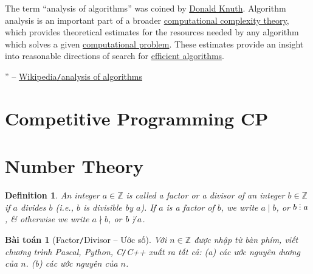 \documentclass{article}
\newtheorem{baitoan}{Bài toán}
\newtheorem{definition}{Definition}
\DeclareRobustCommand{\divby}{%
	\mathrel{\vbox{\baselineskip.65ex\lineskiplimit0pt\hbox{.}\hbox{.}\hbox{.}}}%
}
\begin{document}
The term ``analysis of algorithms'' was coined by \href{https://en.wikipedia.org/wiki/Donald_Knuth}{Donald Knuth}. Algorithm analysis is an important part of a broader \href{https://en.wikipedia.org/wiki/Computational_complexity_theory}{computational complexity theory}, which provides theoretical estimates for the resources needed by any algorithm which solves a given \href{https://en.wikipedia.org/wiki/Computational_problem}{computational problem}. These estimates provide an insight into reasonable directions of search for \href{https://en.wikipedia.org/wiki/Algorithmic_efficiency}{efficient algorithms}.

'' -- \href{https://en.wikipedia.org/wiki/Analysis_of_algorithms}{Wikipedia\texttt{/}analysis of algorithms}


\section{Competitive Programming CP}


\section{Number Theory}

\begin{definition}
	An integer $a\in\mathbb{Z}$ is called a \emph{factor} or a \emph{divisor} of an integer $b\in\mathbb{Z}$ if $a$ divides $b$ (i.e., $b$ is divisible by $a$). If $a$ is a factor of $b$, we write $a\mid b$, or $b\divby a$, \& otherwise we write $a\nmid b$, or $b\not\,\divby a$.
\end{definition}

\begin{baitoan}[Factor\texttt{/}Divisor -- Ước số]
	Với $n\in\mathbb{Z}$ được nhập từ bàn phím, viết chương trình {\sf Pascal, Python, C\texttt{/}C++} xuất ra tất cả: (a) các ước nguyên dương của $n$. (b) các ước nguyên của $n$.
\end{baitoan}
\end{document}
